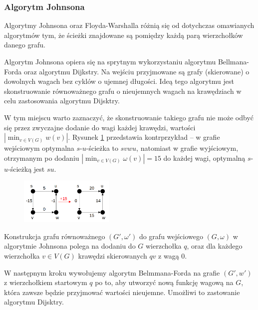 \subsubsection{Algorytm Johnsona}
Algorytmy Johnsona oraz Floyda-Warshalla 
różnią się od dotychczas omawianych algorytmów tym, że
ścieżki znajdowane są pomiędzy każdą parą
wierzchołków danego grafu.

Algorytm Johnsona opiera się na sprytnym wykorzystaniu
algorytmu Bellmana-Forda oraz algorytmu Dijkstry. Na 
wejściu przyjmowane są grafy (skierowane) o dowolnych
wagach bez cyklów o ujemnej długości. Ideą tego
algorytmu jest skonstruowanie równoważnego 
grafu o nieujemnych wagach na krawędziach
w celu zastosowania algorytmu Dijsktry.

W tym miejscu warto zaznaczyć, że skonstruowanie takiego
grafu nie może odbyć się przez zwyczajne dodanie
do wagi każdej krawędzi, wartości $|\!\min_{v \in V(G)}{w(v)}|$. 
Rysunek \ref{fig:kontrprzyklad_johnson}
przedstawia kontrprzykład -- w grafie wejściowym
optymalna $s$-$u$-ścieżka to $svwu$, natomiast
w grafie wyjściowym, otrzymanym po dodaniu
$|\!\min_{v \in V(G)}{\omega(v)}| = 15$ do każdej 
wagi, optymalną $s$-$u$-ścieżką jest $su$.

\begin{figure}[H]
	\centering
	\includegraphics[width=0.4\textwidth]{data/graf_rownowazny_kontrprzyklad.png}
	\caption{  }
	\label{fig:kontrprzyklad_johnson}
\end{figure}

Konstrukcja grafu równoważnego $(G', \omega')$ 
do grafu wejściowego $(G, \omega)$
w algorytmie Johnsona polega na
dodaniu do $G$ wierzchołka $q$, oraz 
dla każdego wierzchołka $v \in V(G)$ krawędzi
skierowanych $qv$ z wagą 0. 

W następnym kroku wywołujemy algorytm Belmmana-Forda
na grafie $(G', w')$ z wierzchołkiem 
startowym $q$ po to, aby utworzyć nową funkcję wagową
na $G$, która zawsze będzie przyjmować wartości 
nieujemne. Umożliwi to zastowanie 
algorytmu Dijsktry. 

